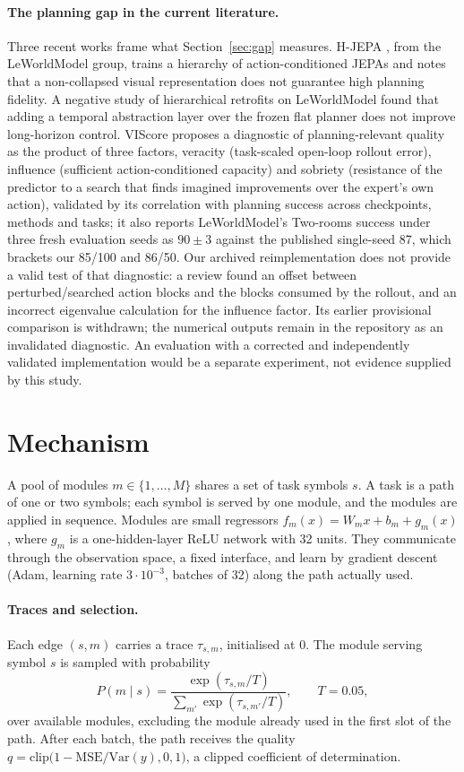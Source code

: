 \documentclass[11pt,a4paper]{article}
\begin{document}
\paragraph{The planning gap in the current literature.} Three recent works frame what Section~\ref{sec:gap} measures. H-JEPA \citep{hjepa2026}, from the LeWorldModel group, trains a hierarchy of action-conditioned JEPAs and notes that a non-collapsed visual representation does not guarantee high planning fidelity. A negative study of hierarchical retrofits on LeWorldModel \citep{mindthegap2026} found that adding a temporal abstraction layer over the frozen flat planner does not improve long-horizon control. VIScore \citep{viscore2026} proposes a diagnostic of planning-relevant quality as the product of three factors, veracity (task-scaled open-loop rollout error), influence (sufficient action-conditioned capacity) and sobriety (resistance of the predictor to a search that finds imagined improvements over the expert's own action), validated by its correlation with planning success across checkpoints, methods and tasks; it also reports LeWorldModel's Two-rooms success under three fresh evaluation seeds as $90 \pm 3$ against the published single-seed 87, which brackets our 85/100 and 86/50. Our archived reimplementation does not provide a valid test of that diagnostic: a review found an offset between perturbed/searched action blocks and the blocks consumed by the rollout, and an incorrect eigenvalue calculation for the influence factor. Its earlier provisional comparison is withdrawn; the numerical outputs remain in the repository as an invalidated diagnostic. An evaluation with a corrected and independently validated implementation would be a separate experiment, not evidence supplied by this study.

\section{Mechanism}

A pool of modules $m \in \{1,\dots,M\}$ shares a set of task symbols $s$. A task is a path of one or two symbols; each symbol is served by one module, and the modules are applied in sequence. Modules are small regressors $f_m(x) = W_m x + b_m + g_m(x)$, where $g_m$ is a one-hidden-layer ReLU network with 32 units. They communicate through the observation space, a fixed interface, and learn by gradient descent (Adam, learning rate $3\cdot10^{-3}$, batches of 32) along the path actually used.

\paragraph{Traces and selection.} Each edge $(s,m)$ carries a trace $\tau_{s,m}$, initialised at 0. The module serving symbol $s$ is sampled with probability
\begin{equation}
P(m \mid s) = \frac{\exp(\tau_{s,m}/T)}{\sum_{m'} \exp(\tau_{s,m'}/T)}, \qquad T = 0.05,
\end{equation}
over available modules, excluding the module already used in the first slot of the path. After each batch, the path receives the quality $q = \mathrm{clip}\big(1 - \mathrm{MSE}/\mathrm{Var}(y), 0, 1\big)$, a clipped coefficient of determination.
\end{document}
